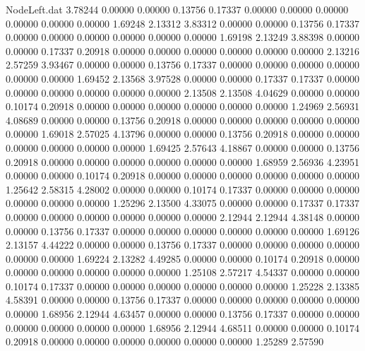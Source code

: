 \begin{filecontents}{NodeLeft.dat}
   3.78244    0.00000    0.00000     0.13756    0.17337    0.00000    0.00000    0.00000    0.00000    0.00000    0.00000    1.69248    2.13312
   3.83312    0.00000    0.00000     0.13756    0.17337    0.00000    0.00000    0.00000    0.00000    0.00000    0.00000    1.69198    2.13249
   3.88398    0.00000    0.00000     0.17337    0.20918    0.00000    0.00000    0.00000    0.00000    0.00000    0.00000    2.13216    2.57259
   3.93467    0.00000    0.00000     0.13756    0.17337    0.00000    0.00000    0.00000    0.00000    0.00000    0.00000    1.69452    2.13568
   3.97528    0.00000    0.00000     0.17337    0.17337    0.00000    0.00000    0.00000    0.00000    0.00000    0.00000    2.13508    2.13508
   4.04629    0.00000    0.00000     0.10174    0.20918    0.00000    0.00000    0.00000    0.00000    0.00000    0.00000    1.24969    2.56931
   4.08689    0.00000    0.00000     0.13756    0.20918    0.00000    0.00000    0.00000    0.00000    0.00000    0.00000    1.69018    2.57025
   4.13796    0.00000    0.00000     0.13756    0.20918    0.00000    0.00000    0.00000    0.00000    0.00000    0.00000    1.69425    2.57643
   4.18867    0.00000    0.00000     0.13756    0.20918    0.00000    0.00000    0.00000    0.00000    0.00000    0.00000    1.68959    2.56936
   4.23951    0.00000    0.00000     0.10174    0.20918    0.00000    0.00000    0.00000    0.00000    0.00000    0.00000    1.25642    2.58315
   4.28002    0.00000    0.00000     0.10174    0.17337    0.00000    0.00000    0.00000    0.00000    0.00000    0.00000    1.25296    2.13500
   4.33075    0.00000    0.00000     0.17337    0.17337    0.00000    0.00000    0.00000    0.00000    0.00000    0.00000    2.12944    2.12944
   4.38148    0.00000    0.00000     0.13756    0.17337    0.00000    0.00000    0.00000    0.00000    0.00000    0.00000    1.69126    2.13157
   4.44222    0.00000    0.00000     0.13756    0.17337    0.00000    0.00000    0.00000    0.00000    0.00000    0.00000    1.69224    2.13282
   4.49285    0.00000    0.00000     0.10174    0.20918    0.00000    0.00000    0.00000    0.00000    0.00000    0.00000    1.25108    2.57217
   4.54337    0.00000    0.00000     0.10174    0.17337    0.00000    0.00000    0.00000    0.00000    0.00000    0.00000    1.25228    2.13385
   4.58391    0.00000    0.00000     0.13756    0.17337    0.00000    0.00000    0.00000    0.00000    0.00000    0.00000    1.68956    2.12944
   4.63457    0.00000    0.00000     0.13756    0.17337    0.00000    0.00000    0.00000    0.00000    0.00000    0.00000    1.68956    2.12944
   4.68511    0.00000    0.00000     0.10174    0.20918    0.00000    0.00000    0.00000    0.00000    0.00000    0.00000    1.25289    2.57590

\end{filecontents}
